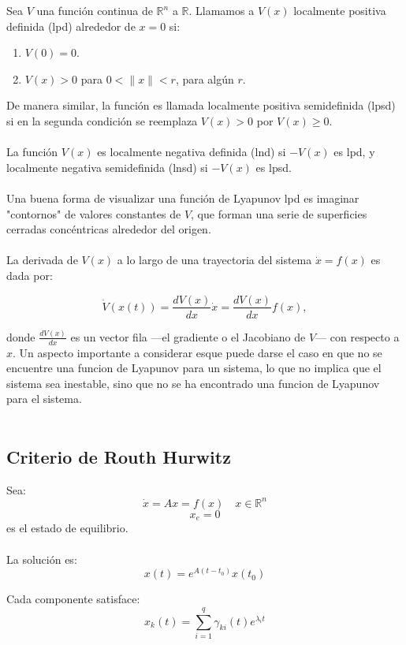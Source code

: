 \documentclass[
  11pt,
  letterpaper,
   addpoints,
   answers
  ]{exam}
\begin{document}
    Sea \( V \) una función continua de \( \mathbb{R}^n \) a \( \mathbb{R} \). Llamamos a \( V(x) \) localmente positiva definida (lpd) alrededor de \( x = 0 \) si:
    \begin{enumerate}
        \item \( V(0) = 0 \).
        \item \( V(x) > 0 \) para \( 0 < \|x\| < r \), para algún \( r \).
    \end{enumerate}
    De manera similar, la función es llamada localmente positiva semidefinida (lpsd) si en la segunda condición se reemplaza \( V(x) > 0 \) por \( V(x) \geq 0 \).\\\\
    La función \( V(x) \) es localmente negativa definida (lnd) si \( -V(x) \) es lpd, y localmente negativa semidefinida (lnsd) si \( -V(x) \) es lpsd.\\\\
    Una buena forma de visualizar una función de Lyapunov lpd es imaginar "contornos" de valores constantes de \( V \), que forman una serie de superficies cerradas concéntricas alrededor del origen.\\\\
    La derivada de \( V(x) \) a lo largo de una trayectoria del sistema \( \dot{x} = f(x) \) es dada por:
    
    \[
    \dot{V}(x(t)) = \frac{dV(x)}{dx} \dot{x} = \frac{dV(x)}{dx} f(x),
    \]
    
    donde \( \frac{dV(x)}{dx} \) es un vector fila —el gradiente o el Jacobiano de \( V \)— con respecto a \( x \). Un aspecto importante a considerar esque puede darse el caso en que no se encuentre una funcion de Lyapunov para un sistema, lo que no implica que el sistema sea inestable, sino que no se ha encontrado una funcion de Lyapunov para el sistema.\\\\


    \subsection*{Criterio de Routh Hurwitz}

    Sea:
    \[
    \dot{x} = A x = f(x) \quad x \in \mathbb{R}^n
    \]
    \[
    x_e = 0
    \]
    es el estado de equilibrio.\\\\
    La solución es:
    \[
    x(t) = e^{A(t-t_0)}x(t_0)
    \]
    
    Cada componente satisface:
    \[
    x_k(t) = \sum_{i=1}^{q} \gamma_{ki}(t)e^{\lambda_i t}
    \]
    
\end{document}
